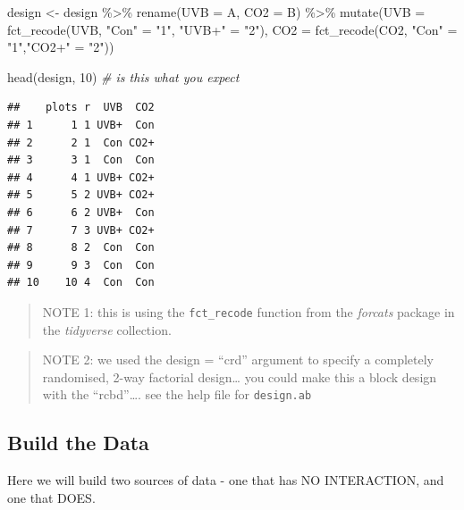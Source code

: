 \documentclass[
]{book}
\newenvironment{Shaded}{\begin{snugshade}}{\end{snugshade}}
\newcommand{\AttributeTok}[1]{\textcolor[rgb]{0.77,0.63,0.00}{#1}}
\newcommand{\CommentTok}[1]{\textcolor[rgb]{0.56,0.35,0.01}{\textit{#1}}}
\newcommand{\DecValTok}[1]{\textcolor[rgb]{0.00,0.00,0.81}{#1}}
\newcommand{\FunctionTok}[1]{\textcolor[rgb]{0.00,0.00,0.00}{#1}}
\newcommand{\NormalTok}[1]{#1}
\newcommand{\OtherTok}[1]{\textcolor[rgb]{0.56,0.35,0.01}{#1}}
\newcommand{\SpecialCharTok}[1]{\textcolor[rgb]{0.00,0.00,0.00}{#1}}
\newcommand{\StringTok}[1]{\textcolor[rgb]{0.31,0.60,0.02}{#1}}
\begin{document}
\begin{Shaded}
\begin{Highlighting}[]
\NormalTok{design }\OtherTok{\textless{}{-}}\NormalTok{ design }\SpecialCharTok{\%\textgreater{}\%}
  \FunctionTok{rename}\NormalTok{(}\AttributeTok{UVB =}\NormalTok{ A, }\AttributeTok{CO2 =}\NormalTok{ B) }\SpecialCharTok{\%\textgreater{}\%} 
  \FunctionTok{mutate}\NormalTok{(}\AttributeTok{UVB =} \FunctionTok{fct\_recode}\NormalTok{(UVB, }\StringTok{"Con"} \OtherTok{=} \StringTok{"1"}\NormalTok{, }\StringTok{"UVB+"} \OtherTok{=} \StringTok{"2"}\NormalTok{),}
         \AttributeTok{CO2 =} \FunctionTok{fct\_recode}\NormalTok{(CO2, }\StringTok{"Con"} \OtherTok{=} \StringTok{"1"}\NormalTok{,}\StringTok{"CO2+"} \OtherTok{=} \StringTok{"2"}\NormalTok{))}

\FunctionTok{head}\NormalTok{(design, }\DecValTok{10}\NormalTok{) }\CommentTok{\# is this what you expect}
\end{Highlighting}
\end{Shaded}

\begin{verbatim}
##    plots r  UVB  CO2
## 1      1 1 UVB+  Con
## 2      2 1  Con CO2+
## 3      3 1  Con  Con
## 4      4 1 UVB+ CO2+
## 5      5 2 UVB+ CO2+
## 6      6 2 UVB+  Con
## 7      7 3 UVB+ CO2+
## 8      8 2  Con  Con
## 9      9 3  Con  Con
## 10    10 4  Con  Con
\end{verbatim}

\begin{quote}
NOTE 1: this is using the \texttt{fct\_recode} function from the \emph{forcats} package in the \emph{tidyverse} collection.
\end{quote}

\begin{quote}
NOTE 2: we used the design = ``crd'' argument to specify a completely randomised, 2-way factorial design\ldots{} you could make this a block design with the ``rcbd''\ldots. see the help file for \texttt{design.ab}
\end{quote}

\hypertarget{build-the-data}{%
\subsection{Build the Data}\label{build-the-data}}

Here we will build two sources of data - one that has NO INTERACTION, and one that DOES.
\end{document}
